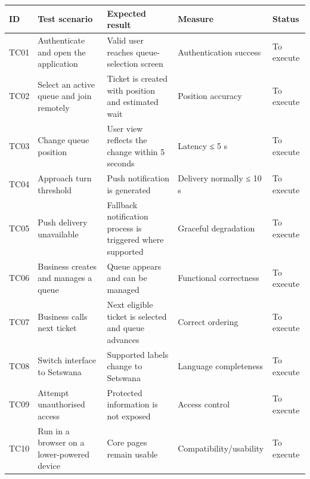 \documentclass[
]{article}
\newcounter{none} %
\begin{document}
{\def\LTcaptype{none} %
\begin{longtable}[]{@{}
  >{\raggedright\arraybackslash}p{}
  >{\raggedright\arraybackslash}p{}
  >{\raggedright\arraybackslash}p{}
  >{\raggedright\arraybackslash}p{}
  >{\raggedright\arraybackslash}p{}@{}}
\toprule\noalign{}
\begin{minipage}[b]{\linewidth}\raggedright
ID
\end{minipage} & \begin{minipage}[b]{\linewidth}\raggedright
Test scenario
\end{minipage} & \begin{minipage}[b]{\linewidth}\raggedright
Expected result
\end{minipage} & \begin{minipage}[b]{\linewidth}\raggedright
Measure
\end{minipage} & \begin{minipage}[b]{\linewidth}\raggedright
Status
\end{minipage} \\
\midrule\noalign{}
\endhead
\bottomrule\noalign{}
\endlastfoot
TC01 & Authenticate and open the application & Valid user reaches
queue-selection screen & Authentication success & To execute \\
TC02 & Select an active queue and join remotely & Ticket is created with
position and estimated wait & Position accuracy & To execute \\
TC03 & Change queue position & User view reflects the change within 5
seconds & Latency ≤ 5 s & To execute \\
TC04 & Approach turn threshold & Push notification is generated &
Delivery normally ≤ 10 s & To execute \\
TC05 & Push delivery unavailable & Fallback notification process is
triggered where supported & Graceful degradation & To execute \\
TC06 & Business creates and manages a queue & Queue appears and can be
managed & Functional correctness & To execute \\
TC07 & Business calls next ticket & Next eligible ticket is selected and
queue advances & Correct ordering & To execute \\
TC08 & Switch interface to Setswana & Supported labels change to
Setswana & Language completeness & To execute \\
TC09 & Attempt unauthorised access & Protected information is not
exposed & Access control & To execute \\
TC10 & Run in a browser on a lower-powered device & Core pages remain
usable & Compatibility/usability & To execute \\
\end{longtable}
}
\end{document}
